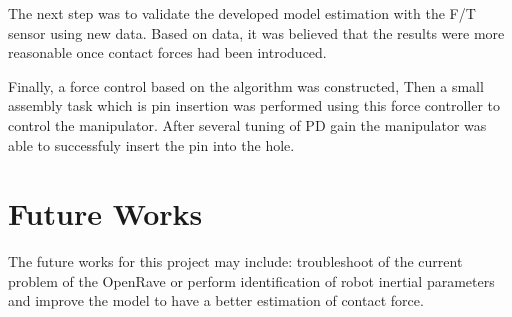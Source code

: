 The next step was to validate the developed model estimation with the F/T sensor using new data. Based on data, it was believed that the results were more reasonable once contact forces had been introduced. 

Finally, a force control based on the algorithm was constructed, Then a small assembly task which is pin insertion was performed using this force controller to control the manipulator. After several tuning of PD gain the manipulator was able to successfuly insert the pin into the hole.

\section{Future Works}
The future works for this project may include: troubleshoot of the current problem of the OpenRave or perform identification of robot inertial parameters and improve the model to have a better estimation of contact force. 



